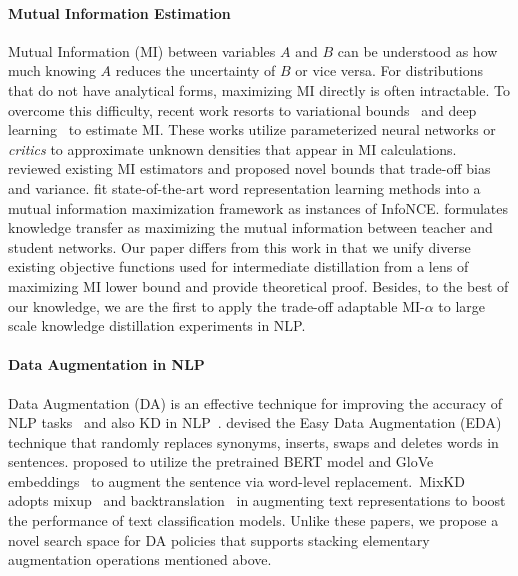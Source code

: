 \documentclass[11pt]{article}
\newcommand{\showcomments}{yes}
\newcommand\szha[1]{
    \ifthenelse{\equal{\showcomments}{yes}}{{\color{orange} Sheng: #1}}{\ignorespaces}}
\begin{document}
\paragraph{Mutual Information Estimation}
Mutual Information (MI) between variables $A$ and $B$ can be understood as how much knowing $A$ reduces the uncertainty of $B$ or vice versa. For distributions that do not have analytical forms, maximizing MI directly is often intractable.
To overcome this difficulty, recent work resorts to variational bounds~\citep{donsker1975asymptotic, blei2017variational, nguyen2010estimating} and deep learning~\citep{oord2018representation} to estimate MI. These works utilize parameterized neural networks
or \emph{critics} 
to approximate unknown densities that appear in MI calculations. \citet{poole2019variational} reviewed existing MI estimators and proposed novel bounds that trade-off bias and variance. \citet{kong2019mutual} fit state-of-the-art word representation learning methods into a mutual information maximization framework as instances of InfoNCE. \citet{ahn2019variational} formulates knowledge transfer as maximizing the mutual information between teacher and student networks.
Our paper differs from this work in that we unify diverse existing objective functions used for intermediate distillation from a lens of maximizing MI lower bound and provide theoretical proof. Besides, to the best of our knowledge, we are the first to apply the trade-off adaptable MI-$\alpha$ to large scale knowledge distillation experiments in NLP.
\paragraph{Data Augmentation in NLP}
Data Augmentation (DA) is an effective technique for improving the accuracy of NLP tasks~\citep{wei2019eda} and also KD in NLP~\citep{jiao2019tinybert, fakoor2020fast}. \citet{wei2019eda}  devised the Easy Data Augmentation (EDA) technique that randomly replaces synonyms, inserts, swaps and deletes words in sentences. \citet{jiao2019tinybert} proposed to utilize the pretrained BERT model and GloVe embeddings~\citep{pennington2014glove} to augment the sentence via word-level replacement.~MixKD~\citep{liang2020mixkd} adopts mixup~\citep{zhang2017mixup} and backtranslation~\citep{edunov2018understanding} in augmenting text representations to boost the performance of text classification models. Unlike these papers, we propose a novel search space for DA policies that supports stacking elementary augmentation operations mentioned above. 
\end{document}
